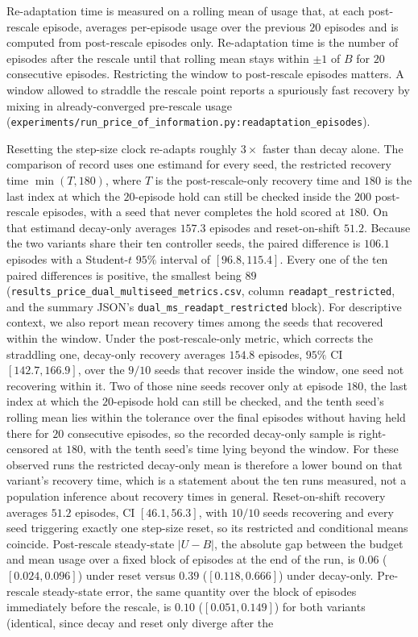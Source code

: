 Re-adaptation time is measured on a rolling mean of usage that, at each post-rescale episode, averages per-episode usage over the previous $20$ episodes and is computed from post-rescale episodes only. Re-adaptation time is the number of episodes after the rescale until that rolling mean stays within $\pm 1$ of $B$ for $20$ consecutive episodes. Restricting the window to post-rescale episodes matters. A window allowed to straddle the rescale point reports a spuriously fast recovery by mixing in already-converged pre-rescale usage (\texttt{experiments/\allowbreak run\_\allowbreak price\_\allowbreak of\_\allowbreak information.py:\allowbreak readaptation\_\allowbreak episodes}).

Resetting the step-size clock re-adapts roughly $3\times$ faster than decay alone. The comparison of record uses one estimand for every seed, the restricted recovery time $\min(T, 180)$, where $T$ is the post-rescale-only recovery time and $180$ is the last index at which the $20$-episode hold can still be checked inside the $200$ post-rescale episodes, with a seed that never completes the hold scored at $180$. On that estimand decay-only averages $157.3$ episodes and reset-on-shift $51.2$. Because the two variants share their ten controller seeds, the paired difference is $106.1$ episodes with a Student-$t$ $95\%$ interval of $[96.8, 115.4]$. Every one of the ten paired differences is positive, the smallest being $89$ (\texttt{results\_\allowbreak price\_\allowbreak dual\_\allowbreak multiseed\_\allowbreak metrics.csv}, column \texttt{readapt\_\allowbreak restricted}, and the summary JSON's \texttt{dual\_\allowbreak ms\_\allowbreak readapt\_\allowbreak restricted} block). For descriptive context, we also report mean recovery times among the seeds that recovered within the window. Under the post-rescale-only metric, which corrects the straddling one, decay-only recovery averages $154.8$ episodes, $95\%$ CI $[142.7, 166.9]$, over the $9/10$ seeds that recover inside the window, one seed not recovering within it. Two of those nine seeds recover only at episode $180$, the last index at which the $20$-episode hold can still be checked, and the tenth seed's rolling mean lies within the tolerance over the final episodes without having held there for $20$ consecutive episodes, so the recorded decay-only sample is right-censored at $180$, with the tenth seed's time lying beyond the window. For these observed runs the restricted decay-only mean is therefore a lower bound on that variant's recovery time, which is a statement about the ten runs measured, not a population inference about recovery times in general. Reset-on-shift recovery averages $51.2$ episodes, CI $[46.1, 56.3]$, with $10/10$ seeds recovering and every seed triggering exactly one step-size reset, so its restricted and conditional means coincide. Post-rescale steady-state $|U-B|$, the absolute gap between the budget and mean usage over a fixed block of episodes at the end of the run, is $0.06$ ($[0.024,0.096]$) under reset versus $0.39$ ($[0.118,0.666]$) under decay-only. Pre-rescale steady-state error, the same quantity over the block of episodes immediately before the rescale, is $0.10$ ($[0.051,0.149]$) for both variants (identical, since decay and reset only diverge after the 